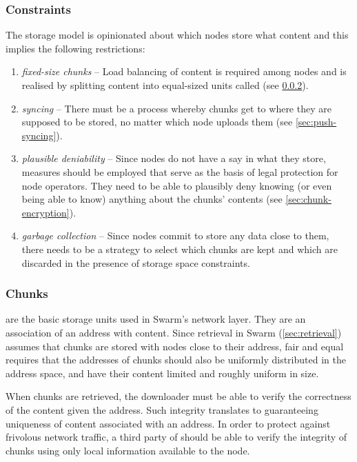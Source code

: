 \subsubsection{Constraints}
The  storage model is opinionated about which nodes store what content and this implies the following restrictions: 

\begin{enumerate}
    \item \emph{fixed-size chunks} -- Load balancing of content is required among nodes and is realised by splitting content into equal-sized units called  (see \ref{sec:chunks}).
    \item \emph{syncing} -- There must be a process whereby chunks get to where they are supposed to be stored, no matter which node uploads them (see \ref{sec:push-syncing}).
    \item \emph{plausible deniability} -- Since nodes do not have a say in what they store, measures should be employed that serve as the basis of legal protection for node operators. They need to be able to plausibly deny knowing (or even being able to know) anything about the chunks' contents (see \ref{sec:chunk-encryption}).
    \item \emph{garbage collection} -- Since nodes commit to store any data close to them, there needs to be a strategy to select which chunks are kept and which are discarded in the presence of storage space constraints. 
\end{enumerate}

\subsubsection{Chunks}\label{sec:chunks}

 are the basic storage units used in Swarm's network layer. They are an association of an address with content. Since retrieval in Swarm (\ref{sec:retrieval}) assumes that chunks are stored with nodes close to their address, fair and equal  requires that the addresses of chunks should also be uniformly distributed in the address space, and have their content limited and roughly uniform in size.  

When chunks are retrieved, the downloader must be able to verify the correctness of the content given the address. Such integrity translates to guaranteeing uniqueness of content associated with an address. In order to protect against frivolous network traffic, a third party of  should be able to verify the integrity of chunks using only local information available to the node.

